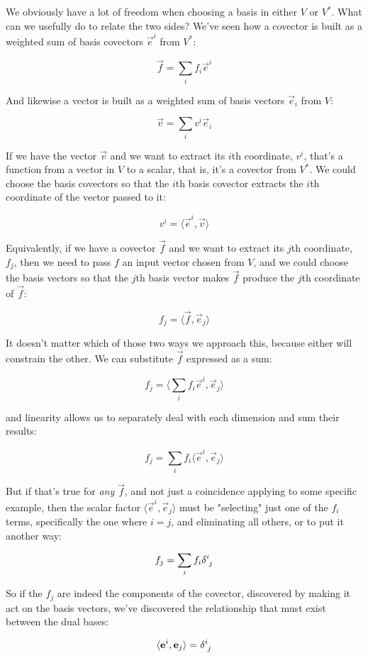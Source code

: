We obviously have a lot of freedom when choosing a basis in either $V$ or $V^*$. What can we usefully do to relate the two sides? We've seen how a covector is built as a weighted sum of basis covectors $\vec{e}^i$ from $V^*$:

$$
\vec{f} = \sum_i f_i \vec{e}^i
$$

And likewise a vector is built as a weighted sum of basis vectors $\vec{e}_i$ from $V$:

$$
\vec{v} = \sum_i v^i \vec{e}_i
$$

If we have the vector $\vec{v}$ and we want to extract its $i$th coordinate, $v^i$, that's a function from a vector in $V$ to a scalar, that is, it's a covector from $V^*$. We could choose the basis covectors so that the $i$th basis covector extracts the $i$th coordinate of the vector passed to it:

$$
v^i = \langle \vec{e}^i , \vec{v} \rangle
$$ 

Equivalently, if we have a covector $\vec{f}$ and we want to extract its $j$th coordinate, $f_j$, then we need to pass $f$ an input vector chosen from $V$, and we could choose the basis vectors so that the $j$th basis vector makes $\vec{f}$ produce the $j$th coordinate of $\vec{f}$:

$$
f_j = \langle \vec{f} , \vec{e}_j\rangle
$$

It doesn't matter which of those two ways we approach this, because either will constrain the other. We can substitute $\vec{f}$ expressed as a sum:

$$
f_j = \langle \sum_i f_i \vec{e}^i , \vec{e}_j\rangle
$$

and linearity allows us to separately deal with each dimension and sum their results:

$$
f_j = \sum_i f_i \langle \vec{e}^i , \vec{e}_j\rangle
$$

But if that's true for \textit{any} $\vec{f}$, and not just a coincidence applying to some specific example, then the scalar factor $\langle \vec{e}^i , \vec{e}_j\rangle$ must be "selecting" just one of the $f_i$ terms, specifically the one where $i = j$, and eliminating all others, or to put it another way:

$$
f_j = \sum_i f_i \delta \indices{^i_j}
$$

So if the $f_j$ are indeed the components of the covector, discovered by making it act on the basis vectors, we've discovered the relationship that must exist between the dual bases:

\begin{equation}
    \langle \vec{e}^i,\vec{e}_j\rangle = \delta\indices{^i_j}
    \label{eqn:dual-bases-delta}
\end{equation}

